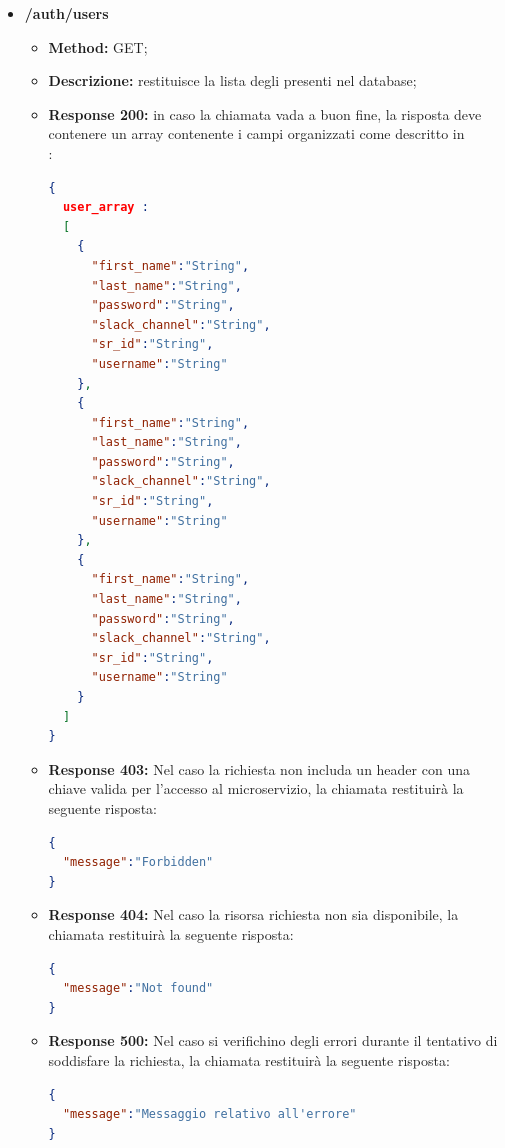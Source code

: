 \begin{itemize}
\item \textbf{/auth/users}\\
\begin{itemize}
\item \textbf{Method:} GET;
\item \textbf{Descrizione:} restituisce la lista degli  presenti nel database;
\item \textbf{Response 200:} in caso la chiamata vada a buon fine, la risposta deve contenere un array contenente i campi organizzati come descritto in \\:
\begin{lstlisting}[language=json,firstnumber=1]
{
  user_array :
  [
    {
      "first_name":"String",
      "last_name":"String",
      "password":"String",
      "slack_channel":"String",
      "sr_id":"String",
      "username":"String"
    },
    {
      "first_name":"String",
      "last_name":"String",
      "password":"String",
      "slack_channel":"String",
      "sr_id":"String",
      "username":"String"
    },
    {
      "first_name":"String",
      "last_name":"String",
      "password":"String",
      "slack_channel":"String",
      "sr_id":"String",
      "username":"String"
    }
  ]
}
\end{lstlisting}
\item \textbf{Response 403:} Nel caso la richiesta non includa un header  con una chiave valida per l'accesso al microservizio, la chiamata restituirà la seguente risposta:
\begin{lstlisting}[language=json,firstnumber=1]
{
  "message":"Forbidden"
}
\end{lstlisting}
\item \textbf{Response 404:} Nel caso la risorsa richiesta non sia disponibile, la chiamata restituirà la seguente risposta:
\begin{lstlisting}[language=json,firstnumber=1]
{
  "message":"Not found"
}
\end{lstlisting}
\item \textbf{Response 500:} Nel caso si verifichino degli errori durante il tentativo di soddisfare la richiesta, la chiamata restituirà la seguente risposta:
\begin{lstlisting}[language=json,firstnumber=1]
{
  "message":"Messaggio relativo all'errore"
}
\end{lstlisting}
\end{itemize}


\end{itemize}
